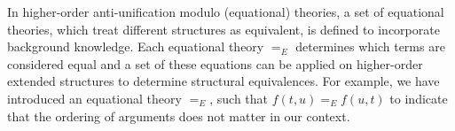 %
%

In higher-order anti-unification modulo (equational) theories, a set of equational theories, which treat different structures as equivalent, is defined to incorporate background knowledge. Each equational theory $=_E$ determines which terms are considered equal and a set of these equations can be applied on higher-order extended structures to determine structural equivalences. For example, we have introduced an equational theory $=_E$, such that $f(t,u) =_E f(u,t)$ to indicate that the ordering of arguments does not matter in our context.

